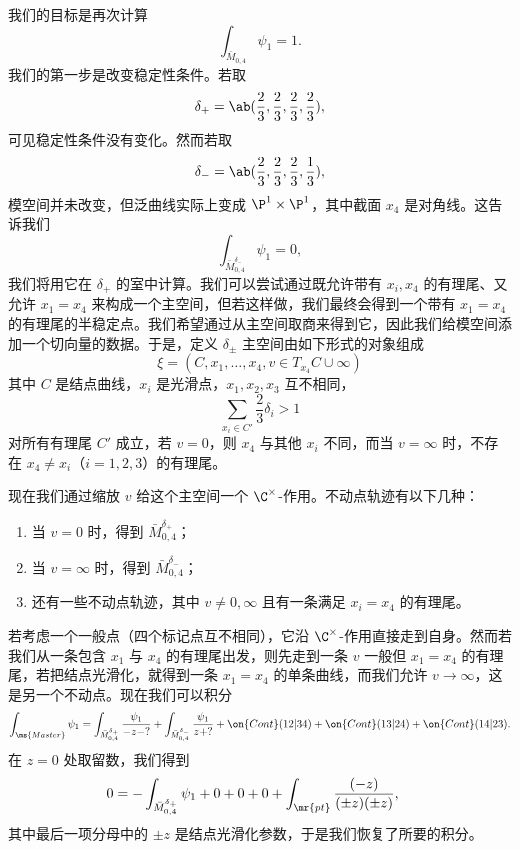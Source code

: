 \begin{exm}[另一个玩具例子]
    我们的目标是再次计算
    \[ \int_{\bar{M}_{0,4}} \psi_1 = 1. \]
    我们的第一步是改变稳定性条件。若取
    \[ \delta_+ = \ab(\frac{2}{3}, \frac{2}{3}, \frac{2}{3}, \frac{2}{3}), \]
    可见稳定性条件没有变化。然而若取
    \[ \delta_- = \ab(\frac{2}{3}, \frac{2}{3}, \frac{2}{3}, \frac{1}{3}), \]
    模空间并未改变，但泛曲线实际上变成 \(\P^1 \times \P^1\)，其中截面 \(x_4\) 是对角线。这告诉我们
    \[ \int_{\bar{M}_{0,4}^{\delta_-}} \psi_1 = 0, \]
    我们将用它在 \(\delta_+\) 的室中计算。我们可以尝试通过既允许带有 \(x_i, x_4\) 的有理尾、又允许 \(x_1 = x_4\) 来构成一个主空间，但若这样做，我们最终会得到一个带有 \(x_1 = x_4\) 的有理尾的半稳定点。我们希望通过从主空间取商来得到它，因此我们给模空间添加一个切向量的数据。于是，定义 \(\delta_{\pm}\) 主空间由如下形式的对象组成
    \[ \xi = (C, x_1, \ldots, x_4, v \in T_{x_4} C \cup \infty) \]
    其中 \(C\) 是结点曲线，\(x_i\) 是光滑点，\(x_1, x_2, x_3\) 互不相同，
    \[ \sum_{x_i \in C'} \frac{2}{3} \delta_i > 1 \]
    对所有有理尾 \(C'\) 成立，若 \(v = 0\)，则 \(x_4\) 与其他 \(x_i\) 不同，而当 \(v = \infty\) 时，不存在 \(x_4 \neq x_i\)（\(i = 1,2,3\)）的有理尾。

    现在我们通过缩放 \(v\) 给这个主空间一个 \(\C^{\times}\)-作用。不动点轨迹有以下几种：
    \begin{enumerate}
        \item 当 \(v = 0\) 时，得到 \(\bar{M}_{0,4}^{\delta_+}\)；
        \item 当 \(v = \infty\) 时，得到 \(\bar{M}_{0,4}^{\delta_-}\)；
        \item 还有一些不动点轨迹，其中 \(v \neq 0,\infty\) 且有一条满足 \(x_i = x_4\) 的有理尾。
    \end{enumerate}

    若考虑一个一般点（四个标记点互不相同），它沿 \(\C^{\times}\)-作用直接走到自身。然而若我们从一条包含 \(x_1\) 与 \(x_4\) 的有理尾出发，则先走到一条 \(v\) 一般但 \(x_1 = x_4\) 的有理尾，若把结点光滑化，就得到一条 \(x_1 = x_4\) 的单条曲线，而我们允许 \(v \to \infty\)，这是另一个不动点。现在我们可以积分
    \begin{align*}
        \int_{\ms{Master}} \psi_1 = \int_{\bar{M}_{0,4}^{\delta_+}} \frac{\psi_1}{-z-?} + \int_{\bar{M}_{0,4}^{\delta_-}} \frac{\psi_1}{z+?} + \on{Cont}(12|34) + \on{Cont}(13|24) + \on{Cont}(14|23).
    \end{align*}
    在 \(z = 0\) 处取留数，我们得到
    \begin{align*}
        0 &= - \int_{\bar{M}_{0,4}^{\delta_+}} \psi_1 + 0 + 0 + 0 + \int_{\mr{pt}} \frac{(-z)}{(\pm z)(\pm z)},
    \end{align*}
    其中最后一项分母中的 \(\pm z\) 是结点光滑化参数，于是我们恢复了所要的积分。
\end{exm}

